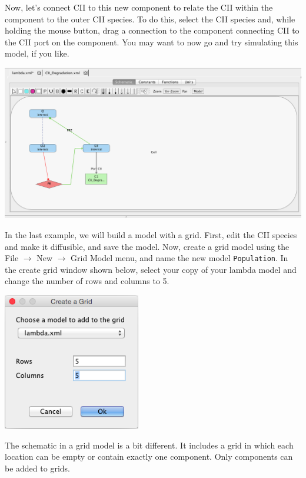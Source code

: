 \documentclass[titlepage,11pt]{article}
\begin{document}
Now, let's connect CII to this new component to relate the CII within the component to the outer CII species.  To do this, select the CII species and, while holding the mouse button, drag a connection to the component connecting CII to the CII port on the component.  
You may want to now go and try simulating this model, if you like.

\begin{center}
\includegraphics[width=160mm]{screenshots/addPort}
\end{center}

In the last example, we will build a model with a grid. First, edit the CII species and make it diffusible, and save the model.  Now, create a grid model using the File $\rightarrow$ New $\rightarrow$ Grid Model menu, and name the new model {\tt Population}.  In the create grid window shown below, select your copy of your lambda model and change the number of rows and columns to 5.  

\begin{center}
\includegraphics[width=60mm]{screenshots/createGrid}
\end{center}

The schematic in a grid model is a bit different.  It includes a grid in which each location can be empty or contain exactly one component.  Only components can be added to grids.
\end{document}
